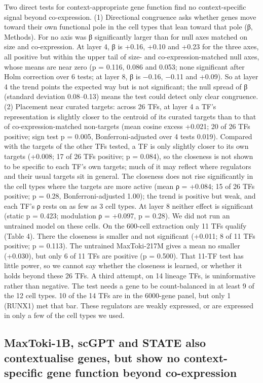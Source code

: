 \documentclass[
  11pt,
]{article}
\newcounter{none} %
\begin{document}
Two direct tests for context-appropriate gene function find no
context-specific signal beyond co-expression. (1) Directional congruence
asks whether genes move toward their own functional pole in the cell
types that lean toward that pole (β, Methods). For no axis was β
significantly larger than for null axes matched on size and
co-expression. At layer 4, β is +0.16, +0.10 and +0.23 for the three
axes, all positive but within the upper tail of size- and
co-expression-matched null axes, whose means are near zero (p = 0.116,
0.086 and 0.053; none significant after Holm correction over 6 tests; at
layer 8, β is −0.16, −0.11 and +0.09). So at layer 4 the trend points
the expected way but is not significant; the null spread of β (standard
deviation 0.08--0.13) means the test could detect only clear congruence.
(2) Placement near curated targets: across 26 TFs, at layer 4 a TF's
representation is slightly closer to the centroid of its curated targets
than to that of co-expression-matched non-targets (mean cosine excess
+0.021; 20 of 26 TFs positive; sign test p = 0.005, Bonferroni-adjusted
over 4 tests 0.019). Compared with the targets of the other TFs tested,
a TF is only slightly closer to its own targets (+0.008; 17 of 26 TFs
positive; p = 0.084), so the closeness is not shown to be specific to
each TF's own targets; much of it may reflect where regulators and their
usual targets sit in general. The closeness does not rise significantly
in the cell types where the targets are more active (mean ρ = +0.084; 15
of 26 TFs positive; p = 0.28, Bonferroni-adjusted 1.00); the trend is
positive but weak, and each TF's ρ rests on as few as 3 cell types. At
layer 8 neither effect is significant (static p = 0.423; modulation ρ =
+0.097, p = 0.28). We did not run an untrained model on these cells. On
the 600-cell extraction only 11 TFs qualify (Table 4). There the
closeness is smaller and not significant (+0.011; 8 of 11 TFs positive;
p = 0.113). The untrained MaxToki-217M gives a mean no smaller (+0.030),
but only 6 of 11 TFs are positive (p = 0.500). That 11-TF test has
little power, so we cannot say whether the closeness is learned, or
whether it holds beyond these 26 TFs. A third attempt, on 14 lineage
TFs, is uninformative rather than negative. The test needs a gene to be
count-balanced in at least 9 of the 12 cell types. 10 of the 14 TFs are
in the 6000-gene panel, but only 1 (RUNX1) met that bar. These
regulators are weakly expressed, or are expressed in only a few of the
cell types we used.

\subsection{MaxToki-1B, scGPT and STATE also contextualise genes, but
show no context-specific gene function beyond
co-expression}\label{maxtoki-1b-scgpt-and-state-also-contextualise-genes-but-show-no-context-specific-gene-function-beyond-co-expression}
\end{document}
